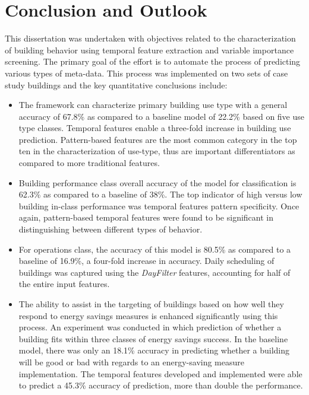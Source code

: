 \chapter{Conclusion and Outlook}
\label{sec:conclusion}

This dissertation was undertaken with objectives related to the characterization of building behavior using temporal feature extraction and variable importance screening. The primary goal of the effort is to automate the process of predicting various types of meta-data. This process was implemented on two sets of case study buildings and the key quantitative conclusions include: 

\begin{itemize}
\item The framework can characterize primary building use type with a general accuracy of 67.8\% as compared to a baseline model of 22.2\% based on five use type classes. Temporal features enable a three-fold increase in building use prediction. Pattern-based features are the most common category in the top ten in the characterization of use-type, thus are important differentiators as compared to more traditional features.
\item Building performance class overall accuracy of the model for classification is 62.3\% as compared to a baseline of 38\%. The top indicator of high versus low building in-class performance was temporal features pattern specificity. Once again, pattern-based temporal features were found to be significant in distinguishing between different types of behavior.
\item For operations class, the accuracy of this model is 80.5\% as compared to a baseline of 16.9\%, a four-fold increase in accuracy. Daily scheduling of buildings was captured using the \emph{DayFilter} features, accounting for half of the entire input features.
\item The ability to assist in the targeting of buildings based on how well they respond to energy savings measures is enhanced significantly using this process. An experiment was conducted in which prediction of whether a building fits within three classes of energy savings success. In the baseline model, there was only an 18.1\% accuracy in predicting whether a building will be good or bad with regards to an energy-saving measure implementation. The temporal features developed and implemented were able to predict a 45.3\% accuracy of prediction, more than double the performance.
\end{itemize}

